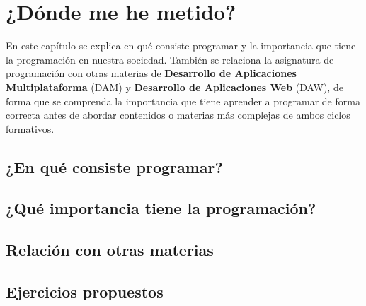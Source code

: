 
\chapter{¿Dónde me he metido?}

En este capítulo se explica en qué consiste programar y la importancia que tiene la programación en nuestra sociedad. 
También se relaciona la asignatura de programación con otras materias de \textbf{Desarrollo de Aplicaciones Multiplataforma} (DAM)
y \textbf{Desarrollo de Aplicaciones Web} (DAW), de forma que se comprenda la importancia que tiene aprender a programar de forma correcta
antes de abordar contenidos o materias más complejas de ambos ciclos formativos.

\section{¿En qué consiste programar?}

\section{¿Qué importancia tiene la programación?}

\section{Relación con otras materias}

\section{Ejercicios propuestos}
